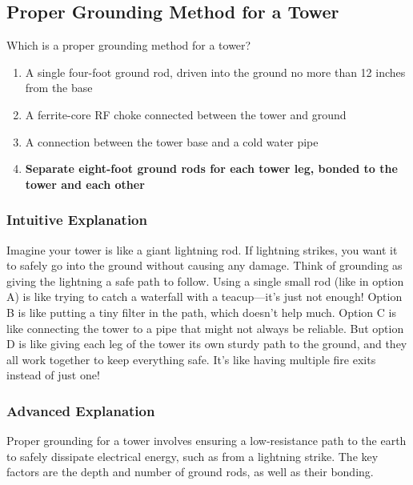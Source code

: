 \subsection{Proper Grounding Method for a Tower}
\label{T0B08}

\begin{tcolorbox}[colback=gray!10!white,colframe=black!75!black,title=T0B08]
Which is a proper grounding method for a tower?
\begin{enumerate}[label=\Alph*]
    \item A single four-foot ground rod, driven into the ground no more than 12 inches from the base
    \item A ferrite-core RF choke connected between the tower and ground
    \item A connection between the tower base and a cold water pipe
    \item \textbf{Separate eight-foot ground rods for each tower leg, bonded to the tower and each other}
\end{enumerate}
\end{tcolorbox}

\subsubsection{Intuitive Explanation}
Imagine your tower is like a giant lightning rod. If lightning strikes, you want it to safely go into the ground without causing any damage. Think of grounding as giving the lightning a safe path to follow. Using a single small rod (like in option A) is like trying to catch a waterfall with a teacup—it’s just not enough! Option B is like putting a tiny filter in the path, which doesn’t help much. Option C is like connecting the tower to a pipe that might not always be reliable. But option D is like giving each leg of the tower its own sturdy path to the ground, and they all work together to keep everything safe. It’s like having multiple fire exits instead of just one!

\subsubsection{Advanced Explanation}
Proper grounding for a tower involves ensuring a low-resistance path to the earth to safely dissipate electrical energy, such as from a lightning strike. The key factors are the depth and number of ground rods, as well as their bonding.

